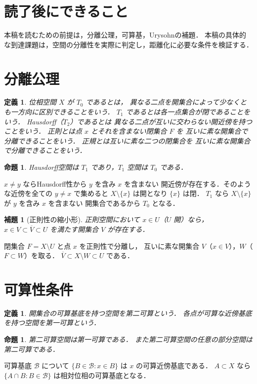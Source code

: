 \documentclass[a5paper,10pt,onecolumn]{jsarticle}
\makeatletter
\theoremstyle{mathnotetheorem}
\newtheorem{definition}[theorem]{定義}
\newtheorem{lemma}[theorem]{補題}
\newtheorem{proposition}[theorem]{命題}
\renewcommand{\proofname}{証明}
\renewenvironment{proof}[1][\proofname]{%
  \par\pushQED{\qed}\normalfont\topsep4\p@\@plus2\p@\relax
  \trivlist\item[\hskip\labelsep\bfseries #1]\ignorespaces
}{\popQED\endtrivlist\@endpefalse}
\makeatother
\begin{document}
\section*{読了後にできること}
本稿を読むための前提は，分離公理，可算基，Urysohnの補題．
本稿の具体的な到達課題は，空間の分離性を実際に判定し，距離化に必要な条件を検証する．


\section{分離公理}
\begin{definition}
位相空間 $X$ が $T_0$ であるとは，
異なる二点を開集合によって少なくとも一方向に区別できることをいう．
$T_1$ であるとは各一点集合が閉であることをいう．
Hausdorff（$T_2$）であるとは
異なる二点が互いに交わらない開近傍を持つことをいう．
正則とは点 $x$ とそれを含まない閉集合 $F$ を
互いに素な開集合で分離できることをいう．
正規とは互いに素な二つの閉集合を
互いに素な開集合で分離できることをいう．
\end{definition}
\begin{proposition}
Hausdorff空間は $T_1$ であり，$T_1$ 空間は $T_0$ である．
\end{proposition}
\begin{proof}
$x\ne y$ ならHausdorff性から $y$ を含み $x$ を含まない
開近傍が存在する．そのような近傍を全ての $y\ne x$ で集めると
$X\setminus\{x\}$ は開となり $\{x\}$ は閉．
$T_1$ なら $X\setminus\{x\}$ が $y$ を含み $x$ を含まない
開集合であるから $T_0$ となる．
\end{proof}
\begin{lemma}[正則性の縮小形]\label{lem:shrink}
正則空間において $x\in U$（$U$ 開）なら，
$x\in V\subset\overline V\subset U$ を満たす開集合 $V$ が存在する．
\end{lemma}
\begin{proof}
閉集合 $F=X\setminus U$ と点 $x$ を正則性で分離し，
互いに素な開集合 $V$（$x\in V$），$W$（$F\subset W$）を取る．
$\overline V\subset X\setminus W\subset U$ である．
\end{proof}
\section{可算性条件}
\begin{definition}
開集合の可算基底を持つ空間を第二可算という．
各点が可算な近傍基底を持つ空間を第一可算という．
\end{definition}
\begin{proposition}
第二可算空間は第一可算である．
また第二可算空間の任意の部分空間は第二可算である．
\end{proposition}
\begin{proof}
可算基底 $\mathcal B$ について
$\{B\in\mathcal B:x\in B\}$ は $x$ の可算近傍基底である．
$A\subset X$ なら
$\{A\cap B:B\in\mathcal B\}$ は相対位相の可算基底となる．
\end{proof}
\end{document}
